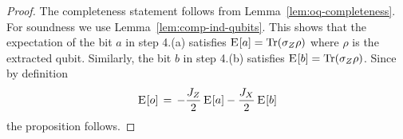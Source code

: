 \begin{proof}
The completeness statement follows from Lemma~\ref{lem:oq-completeness}. For soundness we use Lemma~\ref{lem:comp-ind-qubits}. This shows that the expectation of the bit $a$ in step 4.(a) satisfies $\textsc{E}_{} [a] =  \mbox{\rm Tr}(\sigma_Z \rho)$ where $\rho$ is the extracted qubit. Similarly, the bit $b$ in step 4.(b) satisfies $\textsc{E}_{} [b] =  \mbox{\rm Tr}(\sigma_Z \rho)$. Since by definition
\[\textsc{E}_{} [o] \,=\, -\frac{J_Z}{2}\, \textsc{E}_{} [a] - \frac{J_X}{2}\, \textsc{E}_{} [b] \]
the proposition follows. 
\end{proof}


